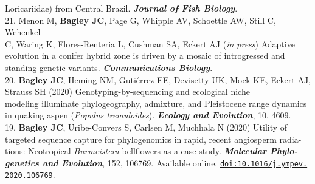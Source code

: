 \documentclass[margin,line]{res}
\begin{document}
\begin{resume}
\hspace*{8mm} Loricariidae) from Central Brazil. {\it \textbf{Journal of Fish Biology}}. \\
21. Menon M, \textbf{Bagley JC}, Page G, Whipple AV, Schoettle AW, Still C, Wehenkel\\
\hspace*{8mm} C, Waring K, Flores-Renteria L, Cushman SA, Eckert AJ (\emph{in press}) Adaptive\\
\hspace*{8mm} evolution in a conifer hybrid zone is driven by a mosaic of introgressed and\\ \vspace{2mm}
\hspace*{8mm}standing genetic variants. {\it \textbf{Communications Biology}}. \\
20. \textbf{Bagley JC}, Heming NM, Guti\'{e}rrez EE, Devisetty UK, Mock KE, Eckert AJ,\\
\hspace*{8mm} Strauss SH (2020) Genotyping-by-sequencing and ecological niche \\
\hspace*{8mm} modeling illuminate phylogeography, admixture, and Pleistocene range dynamics\\ \vspace{2mm}
\hspace*{8mm}in quaking aspen (\textit{Populus tremuloides}). {\it \textbf{Ecology and Evolution}}, 10, 4609.\\
19. \textbf{Bagley JC}, Uribe-Convers S, Carlsen M, Muchhala N (2020) Utility of\\
\hspace*{8mm} targeted sequence capture for phylogenomics in rapid, recent angiosperm radia-\\
\hspace*{8mm} tions: Neotropical \emph{Burmeistera} bellflowers as a case study. \textit{\textbf{Molecular Phylo-}\\ 
\hspace*{8mm}\textbf{ genetics and Evolution}}, 152, 106769. Available online. 
\href{doi:10.1016/j.ympev.2020.106769}{\tt doi:10.1016/j.ympev.}\\
\vspace{2mm}
\hspace*{7mm} \href{doi:10.1016/j.ympev.2020.106769}{\tt2020.106769}.\\

\end{resume}
\end{document}
